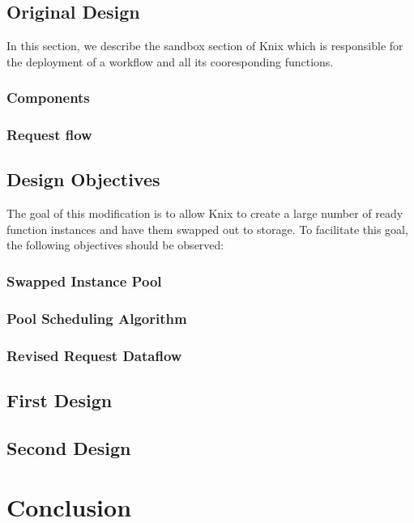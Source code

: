 \documentclass[conference]{IEEEtran}
\begin{document}
\subsection{Original Design}

In this section, we describe the sandbox section of Knix which is responsible for the deployment of a workflow and all its cooresponding functions. 

\subsubsection{Components}

\subsubsection{Request flow}

\subsection{Design Objectives}
The goal of this modification is to allow Knix to create a large number of ready function instances and have them swapped out to storage. To facilitate this goal, the following objectives should be observed:

\subsubsection{Swapped Instance Pool}

\subsubsection{Pool Scheduling Algorithm}

\subsubsection{Revised Request Dataflow}

\subsection{First Design}

\subsection{Second Design}

\section{Conclusion}



\end{document}
